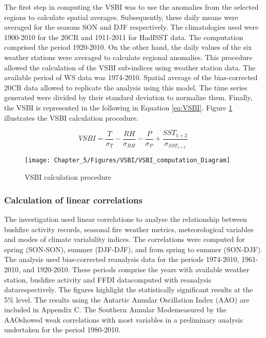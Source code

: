 The first step in computing the VSBI was to use the anomalies from
the selected regions to calculate spatial averages. Subsequently,
these daily means were averaged for the seasons SON and DJF respectively.
The climatologies used were 1900-2010 for the 20CR and 1911-2011 for
HadISST data. The computation comprised the period 1920-2010. On the
other hand, the daily values of the six weather stations were averaged
to calculate regional anomalies. This procedure allowed the calculation of
the VSBI sub-indices using weather station data. The available period
of WS data was 1974-2010. Spatial average of the bias-corrected
20CR data allowed to replicate the analysis using this model. The
time series generated were divided by their standard deviation to
normalize them. Finally, the VSBI is represented in the following
in Equation \ref{eq:VSBI}. Figure \ref{fig:VSBI calculation procedure}
illustrates the VSBI calculation procedure.

\noindent \begin{center}
\begin{equation}
VSBI=\frac{T}{\sigma_{T}}-\frac{RH}{\sigma_{RH}}-\frac{P}{\sigma_{P}}+\frac{SST_{1+2}}{\sigma_{SST_{1+2}}}\label{eq:VSBI}
\end{equation}

\par\end{center}

\begin{figure}[h]
\caption{VSBI calculation procedure \label{fig:VSBI calculation procedure} }


\noindent \centering{}\texttt{[image: Chapter\_5/Figures/VSBI/VSBI\_computation\_Diagram]}
\end{figure}



\subsubsection{Calculation of linear correlations}

The investigation used linear correlations to analyse the relationship
between bushfire activity records, seasonal fire weather metrics,
meteorological variables and modes of climate variability indices.
The correlations were computed for spring (SON-SON), summer (DJF-DJF),
and from spring to summer (SON-DJF). The analysis used bias-corrected
reanalysis data for the periods 1974-2010, 1961-2010, and 1920-2010.
These periods comprise the years with available weather station, bushfire
activity and FFDI data\textemdash computed with reanalysis data\textemdash respectively.
The figures highlight the statistically significant results at the
5\% level. The results using the Antartic Annular Oscillation Index
(AAO) are included in Appendix C. The Southern Annular Mode\textemdash measured
by the AAO\textemdash showed weak correlations with most variables
in a preliminary analysis undertaken for the period 1980-2010. 


